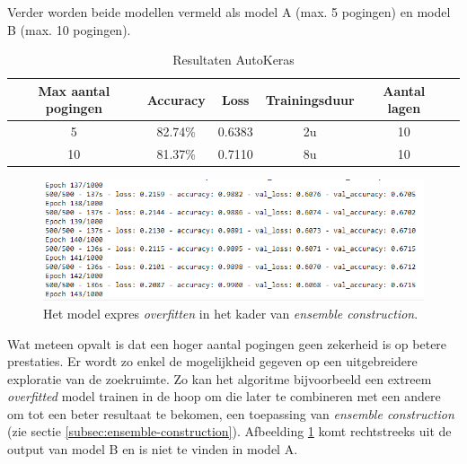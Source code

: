 Verder worden beide modellen vermeld als model A (max. 5 pogingen) en model B (max. 10 pogingen).

\begin{table}[ht]
    \centering
    \begin{tabular}{c c c c c c} %
        \hline\hline %
        Max aantal pogingen & Accuracy & Loss & Trainingsduur & Aantal lagen \\ [0.5ex] %
        \hline %
        5   & 82.74\%   & 0.6383   & 2u    & 10 \\ 
        \hline %
        10   & 81.37\%   & 0.7110   & 8u    & 10 \\ 
        \hline
    \end{tabular}
    \caption{Resultaten AutoKeras}
    \label{table:autokeras-results}
\end{table}

\begin{figure}
    \centering
    \includegraphics[width=\linewidth]{img/autokeras-overfit.png}
    \caption{Het model expres \textit{overfitten} in het kader van \textit{ensemble construction}.}
    \label{fig:autokeras-overfit}
\end{figure}

Wat meteen opvalt is dat een hoger aantal pogingen geen zekerheid is op betere prestaties. Er wordt zo enkel de mogelijkheid gegeven op een uitgebreidere exploratie van de zoekruimte. Zo kan het algoritme bijvoorbeeld een extreem \textit{overfitted} model trainen in de hoop om die later te combineren met een andere om tot een beter resultaat te bekomen, een toepassing van \textit{ensemble construction} (zie sectie \ref{subsec:ensemble-construction}). Afbeelding \ref{fig:autokeras-overfit} komt rechtstreeks uit de output van model B en is niet te vinden in model A.

